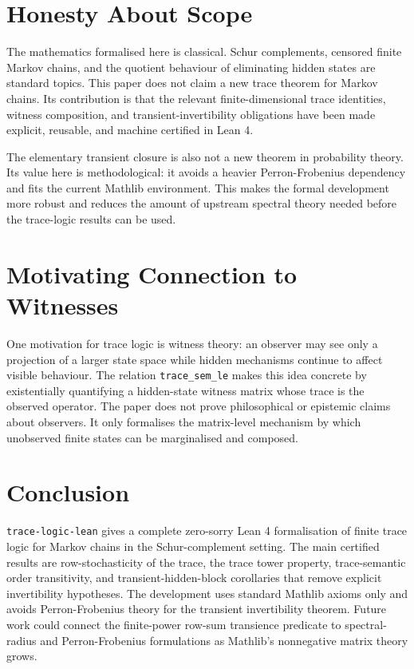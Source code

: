\documentclass[11pt]{article}
\begin{document}
\section{Honesty About Scope}

The mathematics formalised here is classical.
Schur complements, censored finite Markov chains, and the quotient behaviour of eliminating hidden states are standard topics.
This paper does not claim a new trace theorem for Markov chains.
Its contribution is that the relevant finite-dimensional trace identities, witness composition, and transient-invertibility obligations have been made explicit, reusable, and machine certified in Lean 4.

The elementary transient closure is also not a new theorem in probability theory.
Its value here is methodological: it avoids a heavier Perron-Frobenius dependency and fits the current Mathlib environment.
This makes the formal development more robust and reduces the amount of upstream spectral theory needed before the trace-logic results can be used.

\section{Motivating Connection to Witnesses}

One motivation for trace logic is witness theory: an observer may see only a projection of a larger state space while hidden mechanisms continue to affect visible behaviour.
The relation \texttt{trace_sem_le} makes this idea concrete by existentially quantifying a hidden-state witness matrix whose trace is the observed operator.
The paper does not prove philosophical or epistemic claims about observers.
It only formalises the matrix-level mechanism by which unobserved finite states can be marginalised and composed.

\section{Conclusion}

\texttt{trace-logic-lean} gives a complete zero-sorry Lean 4 formalisation of finite trace logic for Markov chains in the Schur-complement setting.
The main certified results are row-stochasticity of the trace, the trace tower property, trace-semantic order transitivity, and transient-hidden-block corollaries that remove explicit invertibility hypotheses.
The development uses standard Mathlib axioms only and avoids Perron-Frobenius theory for the transient invertibility theorem.
Future work could connect the finite-power row-sum transience predicate to spectral-radius and Perron-Frobenius formulations as Mathlib's nonnegative matrix theory grows.
\end{document}
